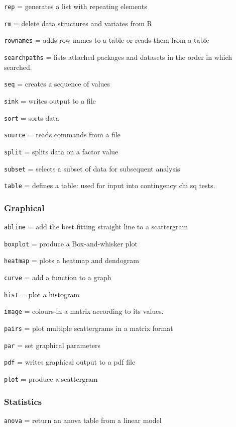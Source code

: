 \documentclass[
]{book}
\begin{document}
\texttt{rep} = generates a list with repeating elements

\texttt{rm} = delete data structures and variates from R

\texttt{rownames} = adds row names to a table or reads them from a table

\texttt{searchpaths} = lists attached packages and datasets in the order in which
searched.

\texttt{seq} = creates a sequence of values

\texttt{sink} = writes output to a file

\texttt{sort} = sorts data

\texttt{source} = reads commands from a file

\texttt{split} = splits data on a factor value

\texttt{subset} = selects a subset of data for subsequent analysis

\texttt{table} = defines a table: used for input into contingency chi sq tests.

\hypertarget{graphical}{%
\subsubsection{Graphical}\label{graphical}}

\texttt{abline} = add the best fitting straight line to a scattergram

\texttt{boxplot} = produce a Box-and-whisker plot

\texttt{heatmap} = plots a heatmap and dendogram

\texttt{curve} = add a function to a graph

\texttt{hist} = plot a histogram

\texttt{image} = colours-in a matrix according to its values.

\texttt{pairs} = plot multiple scattergrams in a matrix format

\texttt{par} = set graphical parameters

\texttt{pdf} = writes graphical output to a pdf file

\texttt{plot} = produce a scattergram

\hypertarget{statistics}{%
\subsubsection{Statistics}\label{statistics}}

\texttt{anova} = return an anova table from a linear model
\end{document}
